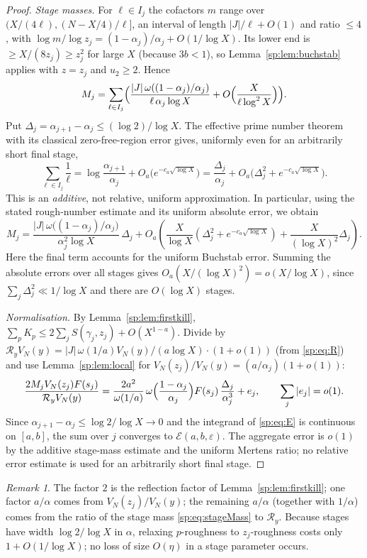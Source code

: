 \documentclass[final,11pt]{elsarticle}
\theoremstyle{definition}
\theoremstyle{remark}
\newtheorem{remark}[theorem]{Remark}
\newcommand{\R}{\mathcal R}
\newcommand{\E}{\mathcal E}
\numberwithin{equation}{section}
\begin{document}
\begin{proof}
\emph{Stage masses.} For $\ell\in I_j$ the cofactors $m$ range over
$(X/(4\ell),(N-X/4)/\ell]$, an interval of length $|J|/\ell+O(1)$ and ratio
$\le4$, with $\log m/\log z_j=(1-\alpha_j)/\alpha_j+O(1/\log X)$. Its lower end
is $\ge X/(8z_j)\ge z_j^2$ for large $X$ (because $3b<1$), so
Lemma~\ref{sp:lem:buchstab} applies with $z=z_j$ and $u_2\ge2$. Hence
\[
 M_j=\sum_{\ell\in I_j}\Bigl(\frac{|J|\,\omega((1-\alpha_j)/\alpha_j)}{\ell\,\alpha_j\log X}
 +O\Bigl(\frac{X}{\ell\log^2X}\Bigr)\Bigr).
\]
Put $\Delta_j=\alpha_{j+1}-\alpha_j\le(\log2)/\log X$.
The effective prime number theorem with its classical
zero-free-region error gives, uniformly even for an arbitrarily
short final stage,
\[
\sum_{\ell\in I_j}\frac1\ell
=\log\frac{\alpha_{j+1}}{\alpha_j}
+O_a\bigl(e^{-c_a\sqrt{\log X}}\bigr)
=\frac{\Delta_j}{\alpha_j}
+O_a\bigl(\Delta_j^2+e^{-c_a\sqrt{\log X}}\bigr).
\]
This is an \emph{additive}, not relative, uniform approximation.
In particular, using the stated rough-number estimate and its
uniform absolute error, we obtain
\begin{equation}\label{sp:eq:stageMass}
 M_j=\frac{|J|\,\omega\bigl((1-\alpha_j)/\alpha_j\bigr)}{\alpha_j^2\log X}\,\Delta_j
 +O_a\!\left(\frac{X}{\log X}
  \left(\Delta_j^2+e^{-c_a\sqrt{\log X}}\right)
   +\frac{X}{(\log X)^2}\Delta_j\right).
\end{equation}
Here the final term accounts for the uniform Buchstab error.
Summing the absolute errors over all stages gives
$O_a(X/(\log X)^2)=o(X/\log X)$, since
$\sum_j\Delta_j^2\ll 1/\log X$ and there are
$O(\log X)$ stages.

\emph{Normalisation.} By Lemma~\ref{sp:lem:firstkill},
$\sum_pK_p\le2\sum_jS(\gamma_j,z_j)+O(X^{1-a})$. Divide by
$\R_yV_N(y)=|J|\,\omega(1/a)V_N(y)/(a\log X)\cdot(1+o(1))$ (from \eqref{sp:eq:R}) and
use Lemma~\ref{sp:lem:local} for $V_N(z_j)/V_N(y)=(a/\alpha_j)(1+o(1))$:
\[
 \frac{2M_jV_N(z_j)F(s_j)}{\R_yV_N(y)}
 =\frac{2a^2}{\omega(1/a)}\,\omega\Bigl(\frac{1-\alpha_j}{\alpha_j}\Bigr)
 F(s_j)\,\frac{\Delta_j}{\alpha_j^3}+e_j,
\qquad \sum_j|e_j|=o(1).
\]
Since $\alpha_{j+1}-\alpha_j\le\log2/\log X\to0$ and the integrand of
\eqref{sp:eq:E} is continuous on $[a,b]$, the sum over $j$ converges to
$\E(a,b,\varepsilon)$. The aggregate error is $o(1)$ by the additive stage-mass estimate
and the uniform Mertens ratio; no relative error estimate is used
for an arbitrarily short final stage.
\end{proof}

\begin{remark}
The factor $2$ is the reflection factor of Lemma~\ref{sp:lem:firstkill}; one factor
$a/\alpha$ comes from $V_N(z_j)/V_N(y)$; the remaining $a/\alpha$ (together with
$1/\alpha$) comes from the ratio of the stage mass \eqref{sp:eq:stageMass} to
$\R_y$. Because stages have width $\log2/\log X$ in $\alpha$, relaxing
$p$-roughness to $z_j$-roughness costs only $1+O(1/\log X)$; no loss of size
$O(\eta)$ in a stage parameter occurs.
\end{remark}
\end{document}
